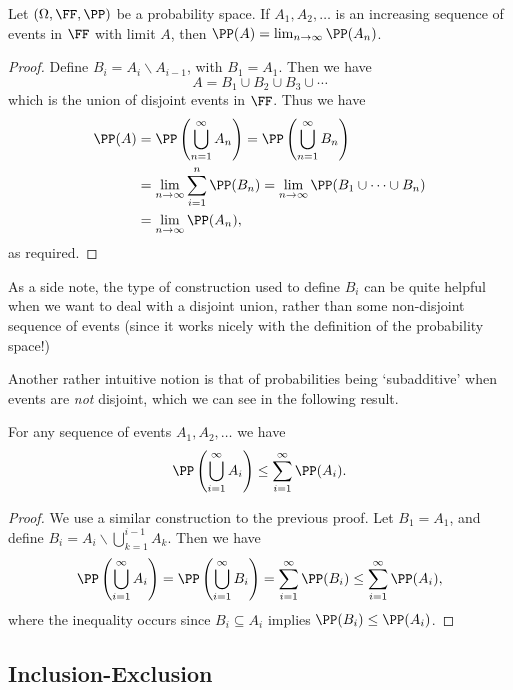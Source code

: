 \begin{theorem}
	Let $(\Omega, \FF,\PP)$ be a probability space. If $A_1, A_2, \dots$ is an increasing sequence of events in $\FF$ with limit $A$, then $\PP(A) = \lim_{n \to \infty} \PP(A_n)$.
\end{theorem}
\begin{proof}
	Define $B_i = A_i \backslash A_{i - 1}$, with $B_1 = A_1$. Then we have
	$$
A = B_1 \cup B_2 \cup B_3 \cup \cdots
	$$
	which is the union of disjoint events in $\FF$. Thus we have
	\begin{align*}
		\PP(A) &= \PP\left(\bigcup_{n = 1}^{\infty} A_n\right) = \PP\left(\bigcup_{n = 1}^{\infty} B_n\right) \\
		&= \lim_{n \to \infty} \sum_{i = 1}^{n} \PP(B_n) = \lim_{n \to \infty} \PP(B_1 \cup \cdots \cup B_n) \\ &= \lim_{n \to \infty} \PP(A_n),
	\end{align*}
	as required.
\end{proof}

As a side note, the type of construction used to define $B_i$ can be quite helpful when we want to deal with a disjoint union, rather than some non-disjoint sequence of events (since it works nicely with the definition of the probability space!)

Another rather intuitive notion is that of probabilities being `subadditive' when events are \emph{not} disjoint, which we can see in the following result.

\begin{theorem}
	For any sequence of events $A_1, A_2, \dots$ we have
	$$
	\PP\left(\bigcup_{i = 1}^{\infty} A_i\right) \leq \sum_{i = 1}^{\infty} \PP(A_i).
	$$
\end{theorem}
\begin{proof}
	We use a similar construction to the previous proof. Let $B_1 = A_1$, and define $B_i = A_i \backslash \bigcup_{k = 1}^{i - 1} A_k$. Then we have
	$$
	\PP\left(\bigcup_{i = 1}^{\infty} A_i\right) = \PP\left(\bigcup_{i = 1}^{\infty} B_i\right) = \sum_{i = 1}^{\infty} \PP(B_i) \leq \sum_{i = 1}^{\infty} \PP(A_i),
	$$
	where the inequality occurs since $B_i \subseteq A_i$ implies $\PP(B_i) \leq \PP(A_i)$.
\end{proof}

\subsection{Inclusion-Exclusion}


